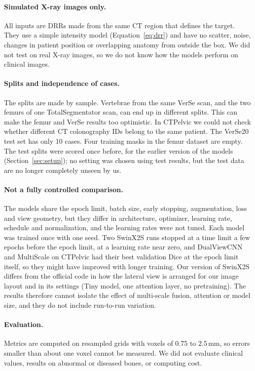 \documentclass[11pt]{article}
\begin{document}
\paragraph{Simulated X-ray images only.}
All inputs are DRRs made from the same CT region that defines the target. They use a simple intensity model (Equation~\ref{eq:drr}) and have no scatter, noise, changes in patient position or overlapping anatomy from outside the box. We did not test on real X-ray images, so we do not know how the models perform on clinical images.

\paragraph{Splits and independence of cases.}
The splits are made by sample. Vertebrae from the same VerSe scan, and the two femurs of one TotalSegmentator scan, can end up in different splits. This can make the femur and VerSe results too optimistic. In CTPelvic we could not check whether different CT colonography IDs belong to the same patient. The VerSe20 test set has only 10 cases. Four training masks in the femur dataset are empty. The test splits were scored once before, for the earlier version of the models (Section~\ref{sec:setup}); no setting was chosen using test results, but the test data are no longer completely unseen by us.

\paragraph{Not a fully controlled comparison.}
The models share the epoch limit, batch size, early stopping, augmentation, loss and view geometry, but they differ in architecture, optimizer, learning rate, schedule and normalization, and the learning rates were not tuned. Each model was trained once with one seed. Two SwinX2S runs stopped at a time limit a few epochs before the epoch limit, at a learning rate near zero, and DualViewCNN and MultiScale on CTPelvic had their best validation Dice at the epoch limit itself, so they might have improved with longer training. Our version of SwinX2S differs from the official code in how the lateral view is arranged for our image layout and in its settings (Tiny model, one attention layer, no pretraining). The results therefore cannot isolate the effect of multi-scale fusion, attention or model size, and they do not include run-to-run variation.

\paragraph{Evaluation.}
Metrics are computed on resampled grids with voxels of 0.75 to 2.5\,mm, so errors smaller than about one voxel cannot be measured. We did not evaluate clinical values, results on abnormal or diseased bones, or computing cost.
\end{document}
